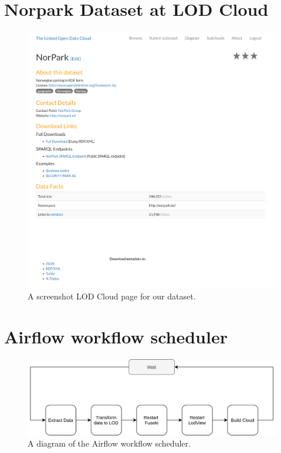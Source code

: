 \chapter{Norpark Dataset at LOD Cloud}
\label{appendix:lod-norpark}
\begin{figure}[H]
	\centering
	\includegraphics[width=\linewidth]{figures/lod-cloud-net-screenshot.png}
	\caption{A screenshot LOD Cloud page for our dataset. }
\end{figure}

\chapter{Airflow workflow scheduler}
\label{appendix:airflow}
\begin{figure}[H]
	\centering
	\includegraphics[width=\linewidth]{figures/airflow.png}
	\caption{A diagram of the Airflow workflow scheduler.}
\end{figure}

